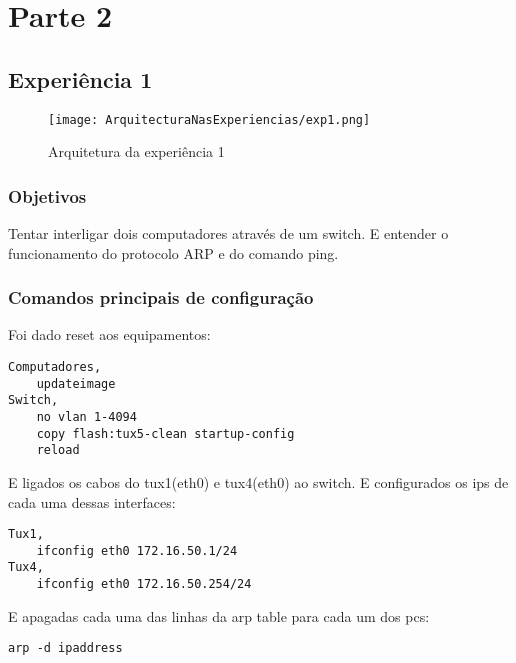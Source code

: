 \documentclass[a4paper]{article}
\begin{document}
\section{Parte 2}

\subsection{Experiência 1}

\begin{figure}[h]
    \centering
    \texttt{[image: ArquitecturaNasExperiencias/exp1.png]}
    \caption{Arquitetura da experiência 1}
\end{figure}

\subsubsection{Objetivos}
Tentar interligar dois computadores através de um switch. E entender o funcionamento do protocolo ARP e do comando ping.

\subsubsection{Comandos principais de configuração}
Foi dado reset aos equipamentos:
\begin{verbatim}
Computadores,
    updateimage
Switch,
    no vlan 1-4094
    copy flash:tux5-clean startup-config
    reload
\end{verbatim}

E ligados os cabos do tux1(eth0) e tux4(eth0) ao switch. E configurados os ips de cada uma dessas interfaces:
\begin{verbatim}
Tux1,
    ifconfig eth0 172.16.50.1/24
Tux4,
    ifconfig eth0 172.16.50.254/24
\end{verbatim}

E apagadas cada uma das linhas da arp table para cada um dos pcs:
\begin{verbatim}
arp -d ipaddress
\end{verbatim}
\end{document}
